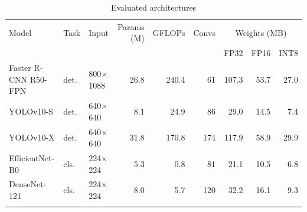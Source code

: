 \begin{table}[htbp]
\footnotesize\setlength{\tabcolsep}{4pt}
\caption{Evaluated architectures}\label{tab:models}
\begin{tabular}{@{}lllrrrrrr@{}}
\toprule
Model & Task & Input & Params (M) & GFLOPs & Convs & \multicolumn{3}{c}{Weights (MB)} \\
\cmidrule{7-9}
 & & & & & & FP32 & FP16 & INT8 \\
\midrule
Faster R-CNN R50-FPN & det. & 800$\times$1088 & 26.8 & 240.4 & 61 & 107.3 & 53.7 & 27.0 \\
YOLOv10-S & det. & 640$\times$640 & 8.1 & 24.9 & 86 & 29.0 & 14.5 & 7.4 \\
YOLOv10-X & det. & 640$\times$640 & 31.8 & 170.8 & 174 & 117.9 & 58.9 & 29.9 \\
EfficientNet-B0 & cls. & 224$\times$224 & 5.3 & 0.8 & 81 & 21.1 & 10.5 & 6.8 \\
DenseNet-121 & cls. & 224$\times$224 & 8.0 & 5.7 & 120 & 32.2 & 16.1 & 9.3 \\
\botrule
\end{tabular}
\end{table}
